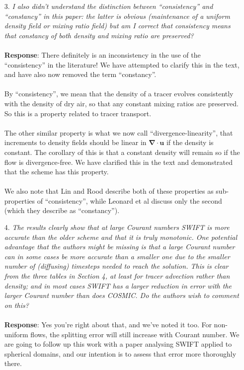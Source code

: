 \documentclass[11pt,a4paper]{article}
\begin{document}
\begin{enumerate}[leftmargin=*]
\item[3.] \textit{I also didn’t understand the distinction between ``consistency'' and ``constancy'' in this paper: the
latter is obvious (maintenance of a uniform density field or mixing ratio field) but am I correct that
consistency means that constancy of both density and mixing ratio are preserved?} \\
\\
\textbf{Response}: There definitely is an inconsistency in the use of the ``consistency'' in the literature! We have attempted to clarify this in the text, and have also now removed the term ``constancy''. \\
\\
By ``consistency'', we mean that the density of a tracer evolves consistently with the density of dry air, so that any constant mixing ratios are preserved. So this is a property related to tracer transport. \\
\\
The other similar property is what we now call ``divergence-linearity'', that increments to density fields should be linear in $\bm{\nabla\cdot u}$ if the density is constant. The corollary of this is that a constant density will remain so if the flow is divergence-free. We have clarified this in the text and demonstrated that the scheme has this property. \\
\\
We also note that Lin and Rood describe both of these properties as sub-properties of ``consistency'', while Leonard et al discuss only the second (which they describe as ``constancy'').

\item[4.] \textit{The results clearly show that at large Courant numbers SWIFT is more accurate than the older scheme and that it is truly monotonic. One potential advantage that the authors might be missing is that a large Courant number can in some cases be more accurate than a smaller one due to the smaller number of (diffusing) timesteps needed to reach the solution. This is clear from the three tables in Section 4, at least for tracer advection rather than density; and in most cases SWIFT has a larger reduction in error with the larger Courant number than does COSMIC. Do the authors wish to comment on this?} \\
\\
\textbf{Response}: Yes you're right about that, and we've noted it too. For non-uniform flows, the splitting error will still increase with Courant number. We are going to follow up this work with a paper analysing SWIFT applied to spherical domains, and our intention is to assess that error more thoroughly there.


\end{enumerate}
\end{document}

